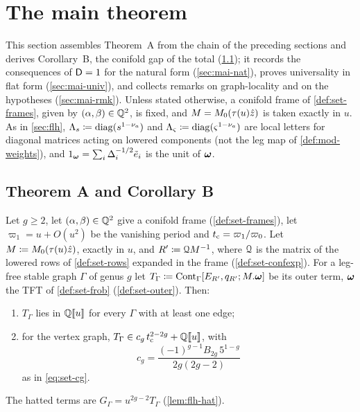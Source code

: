 \section{The main theorem}
\label{sec:mai}

This section assembles Theorem~A from the chain of the preceding sections and derives Corollary~B, the conifold gap of the total (\cref{sec:mai-thm}); it records the consequences of $\mathsf{D}=1$ for the natural form (\cref{sec:mai-nat}), proves universality in flat form (\cref{sec:mai-univ}), and collects remarks on graph-locality and on the hypotheses (\cref{sec:mai-rmk}). Unless stated otherwise, a conifold frame of \cref{def:set-frames}, given by $(\alpha,\beta)\in\mathbb{Q}^2$, is fixed, and $M=M_{0}(\tau(u)\hat{z})$ is taken exactly in $u$. As in \cref{sec:flh}, $\Lambda_s\coloneqq\operatorname{diag}(s^{1-\nu_a})$ and $\Lambda_\varsigma\coloneqq\operatorname{diag}(\varsigma^{1-\nu_a})$ are local letters for diagonal matrices acting on lowered components (not the leg map of \cref{def:mod-weights}), and $1_{\boldsymbol{\omega}}=\sum_i\Delta_i^{-1/2}\tilde e_i$ is the unit of $\boldsymbol{\omega}$.

\subsection{Theorem A and Corollary B}
\label{sec:mai-thm}

\begin{thm}[Theorem A]
\label{thm:mai-main}
Let $g\geq2$, let $(\alpha,\beta)\in\mathbb{Q}^2$ give a conifold frame (\cref{def:set-frames}), let $\varpi_1=u+O(u^2)$ be the vanishing period and $t_{\mathrm{c}}=\varpi_1/\varpi_0$. Let $M\coloneqq M_{0}(\tau(u)\hat{z})$, exactly in $u$, and $R'\coloneqq\mathcal{Q} M^{-1}$, where $\mathcal{Q}$ is the matrix of the lowered rows of \cref{def:set-rows} expanded in the frame (\cref{def:set-confexp}). For a leg-free stable graph $\Gamma$ of genus $g$ let $T_\Gamma\coloneqq\mathrm{Cont}_\Gamma[E_{R'},q_{R'};M.\boldsymbol{\omega}]$ be its outer term, $\boldsymbol{\omega}$ the TFT of \cref{def:set-frob} (\cref{def:set-outer}). Then:
\begin{enumerate}
\item $T_\Gamma$ lies in $\mathbb{Q}[\![ u ]\!]$ for every $\Gamma$ with at least one edge;
\item for the vertex graph, $T_\Gamma\in c_g\,t_{\mathrm{c}}^{2-2g}+\mathbb{Q}[\![ u ]\!]$, with
\[
c_g=\frac{(-1)^{g-1}B_{2g}\,5^{1-g}}{2g(2g-2)}
\]
as in \eqref{eq:set-cg}.
\end{enumerate}
The hatted terms are $G_\Gamma=u^{2g-2}T_\Gamma$ (\cref{lem:flh-hat}).
\end{thm}

